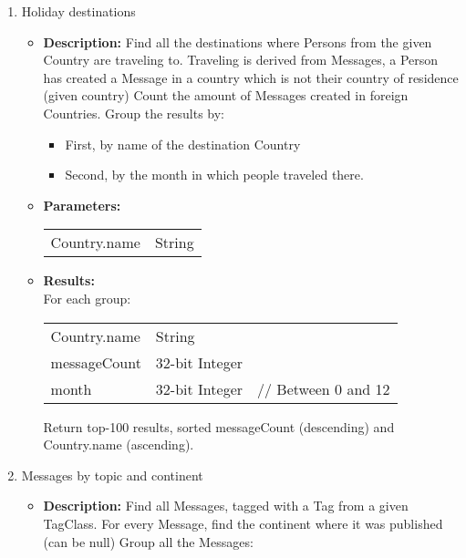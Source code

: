 {\begin{enumerate}
                  \item Holiday destinations
            \begin{itemize}
                \item \textbf{Description:}
                  Find all the destinations where Persons from the given Country are traveling to.  Traveling is derived
                  from Messages, \ie a Person has created a Message in a country which is not their country of
                  residence (given country) Count the amount of Messages created in foreign Countries.  Group the
                  results by:
                  \begin{itemize}
                    \item First, by name of the destination Country
                    \item Second, by the month in which people traveled there.
                  \end{itemize}

                \item \textbf{Parameters:} \\
                    \begin{tabular}{ll}
                      Country.name & String \\
                    \end{tabular}
                \item \textbf{Results:} \\
                  For each group:

                    \begin{tabular}{lll}
                      Country.name & String & \\
                      messageCount & 32-bit Integer & \\
                      month & 32-bit Integer &  \parbox[t]{20cm}{ // Between 0 and 12 \strut}  \\
                    \end{tabular}

                    Return top-100 results, sorted messageCount (descending) and Country.name (ascending).
                    \end{itemize}


                  \item Messages by topic and continent
            \begin{itemize}
                \item \textbf{Description:}
                  Find all Messages, tagged with a Tag from a given TagClass.
                  For every Message, find the continent where it was published (can be null)
                  Group all the Messages:


\end{itemize}
\end{enumerate}}
